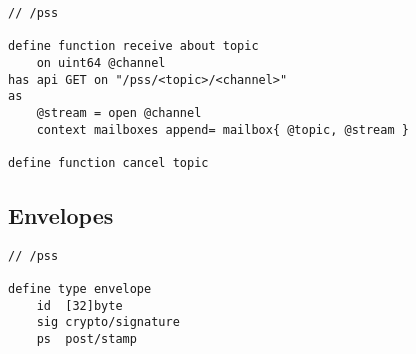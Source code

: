 \begin{definition}\label{def:receive}
\begin{lstlisting}[language=buzz1]
// /pss

define function receive about topic 
    on uint64 @channel
has api GET on "/pss/<topic>/<channel>"
as 
    @stream = open @channel
    context mailboxes append= mailbox{ @topic, @stream }
    
define function cancel topic 
\end{lstlisting}
\end{definition}

\subsection{Envelopes}

\begin{definition}[Envelope]\label{def:pss-envelope}
\begin{lstlisting}[language=buzz1]
// /pss

define type envelope
    id  [32]byte
    sig crypto/signature
    ps  post/stamp   
    
\end{lstlisting}
\end{definition}
